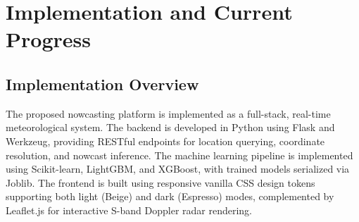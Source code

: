 \documentclass[12pt,a4paper]{report}
\begin{document}
\chapter{Implementation and Current Progress}
\thispagestyle{empty}

\section{Implementation Overview}
The proposed nowcasting platform is implemented as a full-stack, real-time meteorological system. The backend is developed in Python using Flask and Werkzeug, providing RESTful endpoints for location querying, coordinate resolution, and nowcast inference. The machine learning pipeline is implemented using Scikit-learn, LightGBM, and XGBoost, with trained models serialized via Joblib. The frontend is built using responsive vanilla CSS design tokens supporting both light (Beige) and dark (Espresso) modes, complemented by Leaflet.js for interactive S-band Doppler radar rendering.
\end{document}
